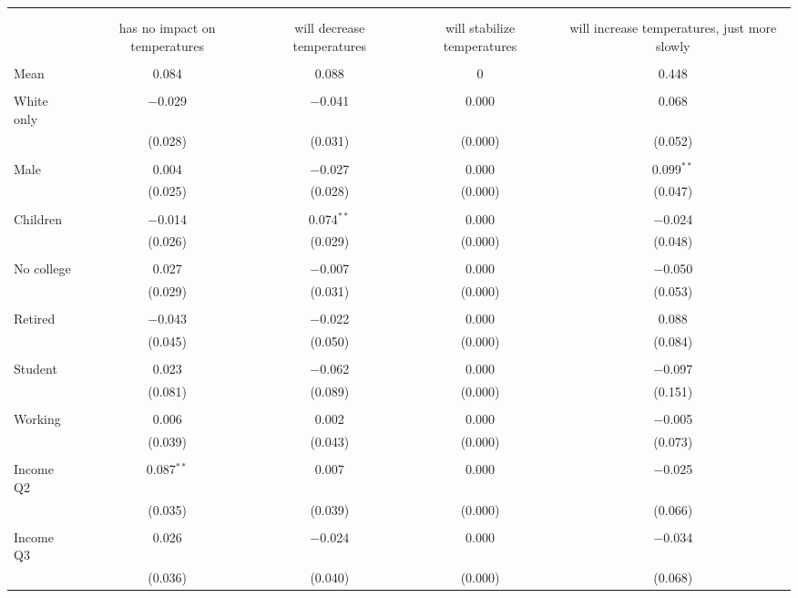 
\begin{tabular}{@{\extracolsep{5pt}}lcccc} 
\\[-1.8ex]\hline 
\hline \\[-1.8ex] 
\\[-1.8ex] & has no impact on temperatures & will decrease temperatures & will stabilize temperatures & will increase temperatures, just more slowly \\ 
\hline \\[-1.8ex] 
 Mean & 0.084 & 0.088 & 0 & 0.448  \\ \hline \\[-1.8ex] White only & $-$0.029 & $-$0.041 & 0.000 & 0.068 \\ 
  & (0.028) & (0.031) & (0.000) & (0.052) \\ 
  & & & & \\ 
 Male & 0.004 & $-$0.027 & 0.000 & 0.099$^{**}$ \\ 
  & (0.025) & (0.028) & (0.000) & (0.047) \\ 
  & & & & \\ 
 Children & $-$0.014 & 0.074$^{**}$ & 0.000 & $-$0.024 \\ 
  & (0.026) & (0.029) & (0.000) & (0.048) \\ 
  & & & & \\ 
 No college & 0.027 & $-$0.007 & 0.000 & $-$0.050 \\ 
  & (0.029) & (0.031) & (0.000) & (0.053) \\ 
  & & & & \\ 
 Retired & $-$0.043 & $-$0.022 & 0.000 & 0.088 \\ 
  & (0.045) & (0.050) & (0.000) & (0.084) \\ 
  & & & & \\ 
 Student & 0.023 & $-$0.062 & 0.000 & $-$0.097 \\ 
  & (0.081) & (0.089) & (0.000) & (0.151) \\ 
  & & & & \\ 
 Working & 0.006 & 0.002 & 0.000 & $-$0.005 \\ 
  & (0.039) & (0.043) & (0.000) & (0.073) \\ 
  & & & & \\ 
 Income Q2 & 0.087$^{**}$ & 0.007 & 0.000 & $-$0.025 \\ 
  & (0.035) & (0.039) & (0.000) & (0.066) \\ 
  & & & & \\ 
 Income Q3 & 0.026 & $-$0.024 & 0.000 & $-$0.034 \\ 
  & (0.036) & (0.040) & (0.000) & (0.068) \\ 

\end{tabular}
